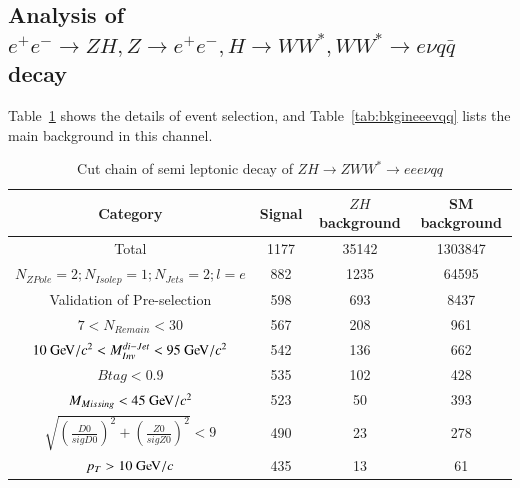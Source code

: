 \documentclass[11pt,a4paper]{cepcnote}
\begin{document}
\subsection{Analysis of $e^+e^-\rightarrow ZH, Z\rightarrow e^+e^-, H\rightarrow WW^*, WW^*\rightarrow e\nu q\bar{q}$ decay}
Table~\ref{tab:cutchaineeevqq} shows the details of event selection, and Table~\ref{tab:bkgineeevqq} lists the main background in 
this channel.
\begin{table}[H]
  \begin{center}
    \begin{tabular}{cccc}
      \hline \hline
      \multicolumn{1}{c}{Category}&\multicolumn{1}{c}{Signal}&\multicolumn{1}{c}{$ZH$ background}&\multicolumn{1}{c}{SM background}\\ 
      \hline
      Total 	      	 									&   1177	& 35142	& 1303847\\
      $N_{ZPole}=2; N_{Isolep}=1; N_{Jets} =2; l = e$		&   882		& 1235	& 64595\\
	  Validation of Pre-selection							&	598		& 693	& 8437		\\
	  $7 < N_{Remain} < 30$									&	567		& 208	& 961\\
	  $10\gev/c^2 < M_{Inv}^{di-Jet} < 95\gev/c^2 $			&	542		& 136	& 662\\
	  $Btag < 0.9$											&	535		& 102	& 428\\
	  $M_{Missing} < 45\gev/c^2$							&   523		&  50	& 393\\
	  $\sqrt{(\frac{D0}{sigD0})^2+(\frac{Z0}{sigZ0})^2} < 9$&   490   	&  23 	& 278\\
	  $p_T > 10 \gev/c$										&	435		&  13	& 61\\
      \hline \hline
    \end{tabular}
  \caption[Monte Carlo purities in the single lepton sample]{%
    Cut chain of semi leptonic decay of $ZH\rightarrow ZWW^* \rightarrow eee\nu qq$}
  \label{tab:cutchaineeevqq}
  \end{center}
\end{table}
\end{document}
